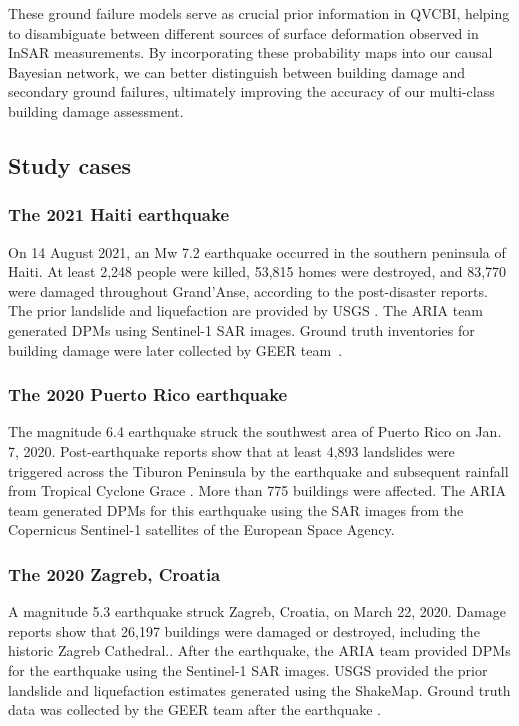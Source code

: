 \documentclass[review]{elsarticle}
\begin{document}
These ground failure models serve as crucial prior information in QVCBI, helping to disambiguate between different sources of surface deformation observed in InSAR measurements. By incorporating these probability maps into our causal Bayesian network, we can better distinguish between building damage and secondary ground failures, ultimately improving the accuracy of our multi-class building damage assessment.

\subsection{Study cases}

\subsubsection{The 2021 Haiti earthquake} On 14 August 2021, an Mw 7.2 earthquake occurred in the southern peninsula of Haiti. At least 2,248 people were killed, 53,815 homes were destroyed, and 83,770 were damaged throughout Grand'Anse, according to the post-disaster reports\cite{Haiti_report}. The prior landslide and liquefaction are provided by USGS \cite{Haiti_LSLF}. The ARIA team generated DPMs using Sentinel-1 SAR images\cite{Haiti_ARIA}. Ground truth inventories for building damage were later collected by GEER team~\cite{HaitiBDGT,HaitiGEER}.
    
\subsubsection{The 2020 Puerto Rico earthquake} The magnitude 6.4 earthquake struck the southwest area of Puerto Rico on Jan. 7, 2020. Post-earthquake reports show that at least 4,893 landslides were triggered across the Tiburon Peninsula by the earthquake and subsequent rainfall from Tropical Cyclone Grace \cite{28}. More than 775 buildings were affected. The ARIA team generated DPMs for this earthquake using the SAR images from the Copernicus Sentinel-1 satellites of the European Space Agency. 
    



\subsubsection{The 2020 Zagreb, Croatia} 
A magnitude 5.3 earthquake struck Zagreb, Croatia, on March 22, 2020\cite{zagreb_info}. Damage reports show that 26,197 buildings were damaged or destroyed, including the historic Zagreb Cathedral.\cite{zagreb_impact}. After the earthquake, the ARIA team provided DPMs for the earthquake using the Sentinel-1 SAR images\cite{zagreb_dpm}. USGS provided the prior landslide and liquefaction estimates generated using the ShakeMap\cite{zagreb_sm}. Ground truth data was collected by the GEER team after the earthquake \cite{GEER2020}.
   
\end{document}
